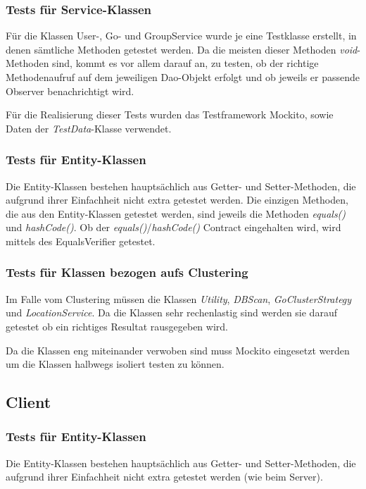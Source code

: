 \documentclass[11pt,a4paper]{scrartcl}
\begin{document}
\subsubsection{Tests für Service-Klassen}
Für die Klassen User-, Go- und GroupService wurde je eine Testklasse erstellt, in denen sämtliche Methoden getestet werden. Da die meisten dieser Methoden \textit{void}-Methoden sind, kommt es vor allem darauf an, zu testen, ob der richtige Methodenaufruf auf dem jeweiligen Dao-Objekt erfolgt und ob jeweils er passende Observer benachrichtigt wird.

Für die Realisierung dieser Tests wurden das Testframework Mockito, sowie Daten der \textit{TestData}-Klasse verwendet.

\subsubsection{Tests für Entity-Klassen}
Die Entity-Klassen bestehen hauptsächlich aus Getter- und Setter-Methoden, die aufgrund ihrer Einfachheit nicht extra getestet werden. Die einzigen Methoden, die aus den Entity-Klassen getestet werden, sind jeweils die Methoden \textit{equals()} und \textit{hashCode()}. Ob der \textit{equals()}/\textit{hashCode()} Contract eingehalten wird, wird mittels des EqualsVerifier getestet.

\subsubsection{Tests für Klassen bezogen aufs Clustering}
Im Falle vom Clustering müssen die Klassen \textit{Utility}, \textit{DBScan}, \textit{GoClusterStrategy} und \textit{LocationService}. Da die Klassen sehr rechenlastig sind werden sie darauf getestet ob ein richtiges Resultat rausgegeben wird.

Da die Klassen eng miteinander verwoben sind muss Mockito eingesetzt werden um die Klassen halbwegs isoliert testen zu können.

\subsection{Client}

\subsubsection{Tests für Entity-Klassen}
Die Entity-Klassen bestehen hauptsächlich aus Getter- und Setter-Methoden, die aufgrund ihrer Einfachheit nicht extra getestet werden (wie beim Server). 
\end{document}
